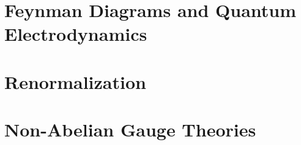 \documentclass[10pt,b5paper,openany]{book} %
\begin{document}
\begin{spacing}{1.2}
\setcounter{page}{1}
\part{Feynman Diagrams and Quantum Electrodynamics}















\part{Renormalization}













\part{Non-Abelian Gauge Theories}





















\end{spacing}
\end{document}
